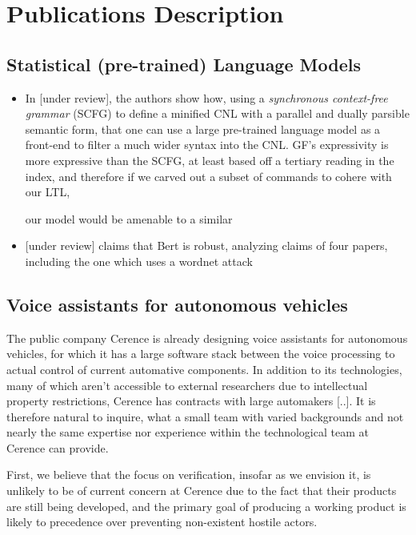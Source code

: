 \documentclass[a4paper, 11pt]{article}
\begin{document}
\section{Publications Description}

\subsection{Statistical (pre-trained) Language Models}


\begin{itemize}

\item In \cite{fewShotSem} [under review], the authors show how, using a \emph{synchronous
context-free grammar} (SCFG) to define a minified CNL with a parallel and dually
parsible semantic form, that one can use a large pre-trained language model as a front-end
to filter a much wider syntax into the CNL. GF's expressivity is
more expressive than the SCFG, at least based off a tertiary reading in the
index, and therefore if we carved out a subset of commands to cohere with our
LTL,

our model would be amenable to a similar

\item  \cite{hauser2021bert} [under review] claims that Bert is robust, analyzing claims of four
  papers, including the one which uses a wordnet attack

\end{itemize}

\subsection{Voice assistants for autonomous vehicles}

The public company Cerence \cite{} is already designing voice assistants for autonomous
vehicles, for which it has a large software stack between the voice processing
to actual control of current automative components. In addition to its 
technologies, many of which aren't accessible to external researchers due to
intellectual property restrictions, Cerence has contracts with large automakers
[..]. It is therefore natural to inquire, what a small team with varied
backgrounds and not nearly the same expertise nor experience within the
technological team at Cerence can provide.

First, we believe that the focus on verification, insofar as we envision it, is
unlikely to be of current concern at Cerence due to the fact that their products
are still being developed, and the primary goal of producing a working product
is likely to precedence over preventing non-existent hostile actors.
\end{document}
